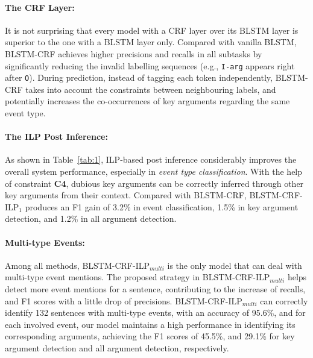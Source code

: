 
\paragraph{The CRF Layer:} 
It is not surprising that  every model with a CRF layer over its BLSTM layer is superior to the one with a BLSTM layer only. Compared with vanilla BLSTM, BLSTM-CRF achieves higher precisions and recalls in all subtasks by significantly reducing the invalid labelling sequences (e.g., \texttt{I-arg} appears right after \texttt{O}). During prediction, instead of tagging each token independently, BLSTM-CRF takes into account the constraints between neighbouring labels, and potentially increases the co-occurrences of key arguments regarding the same event type. %

\paragraph{The ILP Post Inference:} 
As shown in Table~\ref{tab:1}, ILP-based post inference considerably improves the overall system performance, especially in \textit{event type classification}. With the help of constraint \textbf{C4},  dubious key arguments can be correctly inferred through other key arguments from their context. Compared with BLSTM-CRF, BLSTM-CRF-ILP$_1$ produces an F1 gain of 3.2\% in event classification, 1.5\% in key argument detection, and 1.2\% in all argument detection. %

\paragraph{Multi-type Events:}
Among all methods, BLSTM-CRF-ILP$_{multi}$ is the only model that can deal with multi-type event mentions. %
The proposed strategy in BLSTM-CRF-ILP$_{multi}$ helps detect more event mentions for a sentence, contributing to the increase of recalls, and F1 scores with a little drop of precisions. 
BLSTM-CRF-ILP$_{multi}$ can correctly identify 132 sentences with multi-type events, 
with an accuracy of 95.6\%, and for each involved event, our model maintains a high 
performance in identifying its corresponding arguments, achieving the F1 scores of 45.5\%, and 29.1\% for key argument detection and all argument detection, respectively. 

